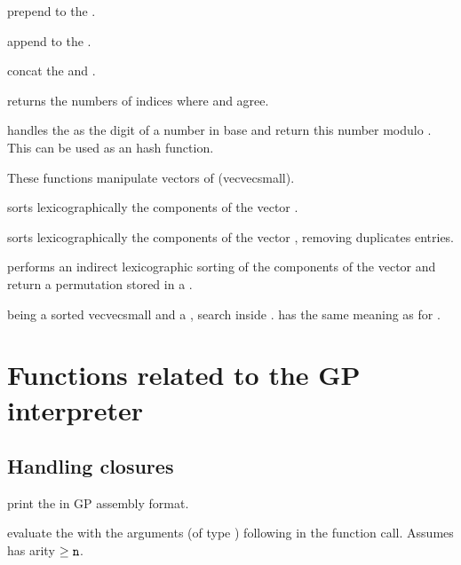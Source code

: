  prepend  to the
 .

 append  to the
 .

 concat the  
and .

 returns the numbers of indices
where  and  agree.

 handles the
  as the digit of a number in base  and return
this number modulo . This can be used as an hash function.

These functions manipulate vectors of  (vecvecsmall).

 sorts lexicographically the components of
the vector .

 sorts lexicographically the components of
the vector , removing duplicates entries.

 performs an indirect lexicographic
sorting of the components of the vector  and return a permutation
stored in a .

  being a sorted
vecvecsmall and  a , search  inside .
 has the same meaning as for .

\newpage
\chapter{Functions related to the GP interpreter}

\section{Handling closures}\label{se:closure}


 print the   in
GP assembly format.

 evaluate the 
 with the  arguments (of type ) following  in
the function call. Assumes  has arity $\geq {\tt n}$.

